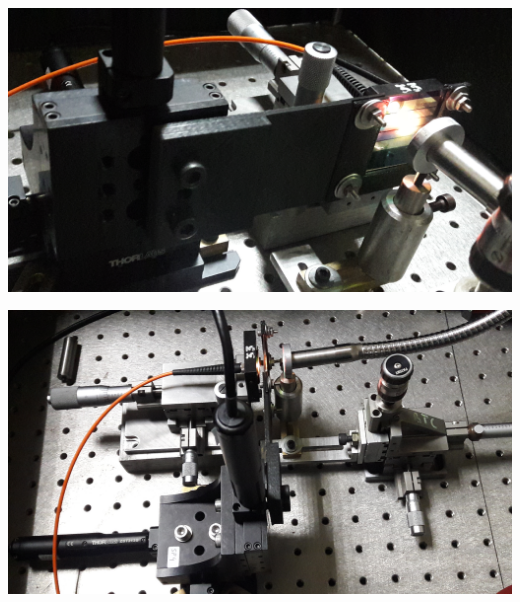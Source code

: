 \documentclass[12pt,dvipsnames]{exam}
\begin{document}
\begin{center}
	\includegraphics[scale=0.1]{imgs/setup_barrido/9.jpg}
\end{center}

\begin{center}
	\includegraphics[scale=0.1]{imgs/setup_barrido/10.jpg}
\end{center}

 
\end{document}
